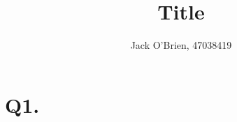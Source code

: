 \documentclass[12pt]{article}
\title{Title}
\author{Jack O'Brien, 47038419}
\date{}
\begin{document}
\maketitle

\section*{Q1. }
\end{document}
